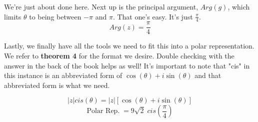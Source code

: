 \begin{solution}
    We're just about done here. Next up is the principal argument, $Arg(g)$, which limits $\theta$ to being between $-\pi$ and $\pi$. That one's easy. It's just $\frac{\pi}{4}$. 
    \[\boxed{Arg(z) = \frac{\pi}{4}}\]
    
    Lastly, we finally have all the tools we need to fit this into a polar representation. We refer to \textbf{theorem 4} for the format we desire. Double checking with the answer in the back of the book helps as well! It's important to note that "cis" in this instance is an abbreviated form of $\cos(\theta) + i \sin(\theta)$ and that abbreviated form is what we need.
    
    \[ |z|cis(\theta) = |z| [\cos(\theta) + i \sin(\theta)] \]
    \[\boxed{ \text{Polar Rep.} \; = 9\sqrt{2} \; cis \left( \frac{\pi}{4} \right) }\]
\end{solution}
